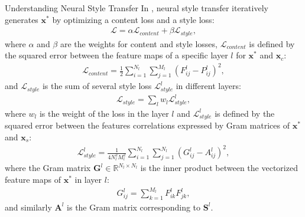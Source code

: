 \begin{section}{Understanding Neural Style Transfer}
In \cite{neuralart}, neural style transfer iteratively generates $\mathbf{x}^*$ by optimizing a content loss and a style loss:
\begin{equation}\label{eq:total_loss}
\begin{aligned}
\mathcal{L} = \alpha\mathcal{L}_{content} + \beta\mathcal{L}_{style},
\end{aligned}
\end{equation}
where $\alpha$ and $\beta$ are the weights for content and style losses, $\mathcal{L}_{content}$ is defined by the squared error between the feature maps of a specific layer $l$ for $\mathbf{x}^*$ and $\mathbf{x}_c$:
\begin{equation}
\begin{aligned}
\mathcal{L}_{content} = \frac{1}{2}\sum_{i=1}^{N_l}\sum_{j=1}^{M_l}(F_{ij}^l - P_{ij}^l)^2,
\end{aligned}
\end{equation}
and $\mathcal{L}_{style}$ is the sum of several style loss $\mathcal{L}_{style}^{l}$ in different layers:
\begin{equation}
\begin{aligned}
\mathcal{L}_{style} = \sum_{l} w_l\mathcal{L}_{style}^{l},
\end{aligned}
\end{equation}
where $w_l$ is the weight of the loss in the layer $l$ and  $\mathcal{L}_{style}^{l}$ is defined by the squared error between the features correlations expressed by Gram matrices of $\mathbf{x}^*$ and $\mathbf{x}_s$:
\begin{equation}\label{eq_style}
\begin{aligned}
\mathcal{L}_{style}^l = \frac{1}{4N_l^2M_l^2}\sum_{i=1}^{N_l}\sum_{j=1}^{N_l}(G_{ij}^l - A_{ij}^l)^2,
\end{aligned}
\end{equation}
where the Gram matrix $\mathbf{G}^l \in \mathbb{R}^{N_l \times N_l}$ is the inner product between the vectorized feature maps of $\mathbf{x}^*$ in layer $l$:
\begin{equation}
\begin{aligned}
G_{ij}^l = \sum_{k=1}^{M_l}F_{ik}^lF_{jk}^l,
\end{aligned}
\end{equation}
and similarly $\mathbf{A}^l$ is the Gram matrix corresponding to $\mathbf{S}^l$.


\end{section}
